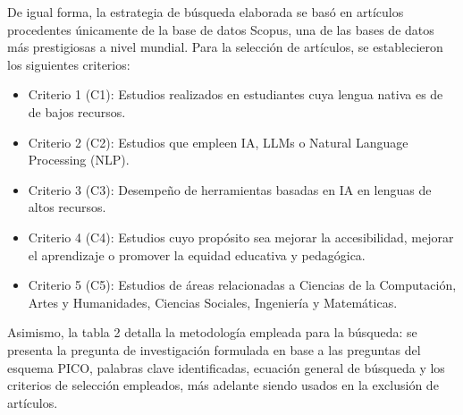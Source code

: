 De igual forma, la estrategia de búsqueda elaborada se basó en artículos procedentes únicamente de la base de datos Scopus, una de las bases de datos más prestigiosas a nivel mundial. Para la selección de artículos, se establecieron los siguientes criterios:

\begin{itemize}
   \setlength{\itemsep}{0pt}
   \setlength{\parskip}{0pt}
   \item Criterio 1 (C1): Estudios realizados en estudiantes cuya lengua nativa es de de bajos recursos.
   \item Criterio 2 (C2): Estudios que empleen IA, LLMs o Natural Language Processing (NLP).
   \item Criterio 3 (C3): Desempeño de herramientas basadas en IA en lenguas de altos recursos.
   \item Criterio 4 (C4): Estudios cuyo propósito sea mejorar la accesibilidad, mejorar el aprendizaje o promover la equidad educativa y pedagógica.
   \item Criterio 5 (C5): Estudios de áreas relacionadas a Ciencias de la Computación, Artes y Humanidades, Ciencias Sociales, Ingeniería y Matemáticas.
\end{itemize}

Asimismo, la tabla 2 detalla la metodología empleada para la búsqueda: se presenta la pregunta de investigación formulada en base a las preguntas del esquema PICO, palabras clave identificadas, ecuación general de búsqueda y los criterios de selección empleados, más adelante siendo usados en la exclusión de artículos.


